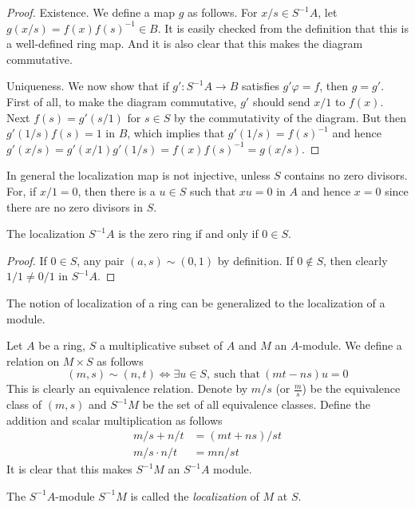 \begin{proof}
Existence. We define a map $g$ as follows. For $x/s\in
S^{-1}A$, let $g(x/s) = f(x)f(s)^{-1}\in B$. It is easily checked from
the definition that this is a well-defined ring map. And it is also clear that
this makes the diagram commutative.

\medskip\noindent
Uniqueness. We now show that if $g' : S^{-1}A \rightarrow B$
satisfies $g'\varphi = f$, then $g = g'$. First of all, to make
the diagram commutative, $g'$ should send
$x/1$ to $f(x)$. Next $f(s) = g'(s/1)$ for $s\in S$ by the
commutativity of the diagram. But then $g'(1/s)f(s) = 1$ in $B$,
which implies that $g'(1/s) = f(s)^{-1}$ and hence
$g'(x/s) = g'(x/1)g'(1/s) = f(x)f(s)^{-1} = g(x/s)$.
\end{proof}

\noindent
In general the localization map is not injective, unless $S$
contains no zero divisors. For, if $x/1 = 0$, then there is a $u\in S$
such that $xu = 0$ in $A$ and hence $x = 0$ since there are no zero
divisors in $S$.

\begin{lemma}
\label{lemma-localization-zero}
The localization $S^{-1}A$ is the zero ring if and only if $0\in S$.
\end{lemma}

\begin{proof}
If $0\in S$, any pair $(a, s)\sim (0, 1)$ by definition.
If $0\not \in S$, then clearly $1/1 \neq 0/1$ in $S^{-1}A$.
\end{proof}

\noindent
The notion of localization of a ring can be generalized to the
localization of a module.

\medskip\noindent
Let $A$ be a ring, $S$ a multiplicative subset of $A$ and $M$ an $A$-module.
We define a relation on
$M\times S$ as follows
$$
(m, s)\sim(n, t) \iff \exists u\in S, \ \text{such that}\ (mt-ns)u = 0
$$
This is clearly an equivalence relation. Denote by $m/s$ (or
$\frac{m}{s}$) be the equivalence class of $(m, s)$ and $S^{-1}M$ be
the set of all equivalence classes. Define the addition and scalar
multiplication as follows
\begin{align}
m/s + n/t& = (mt + ns)/st\\
m/s\cdot n/t& = mn/st
\end{align}
It is clear that this makes $S^{-1}M$ an $S^{-1}A$ module.

\medskip\noindent
The $S^{-1}A$-module $S^{-1}M$ is called the \emph{localization} of $M$ at $S$.

